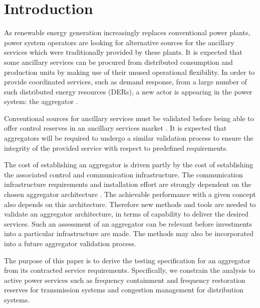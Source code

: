 \section{Introduction}
As renewable energy generation increasingly replaces conventional power plants, power system operators are looking for alternative sources for the ancillary services which were traditionally provided by these plants. It is expected that some ancillary services can be procured from distributed consumption and production units by making use of their unused operational flexibility. In order to provide coordinated services, such as demand response, from a large number of such distributed energy resources (DERs), a new actor is appearing in the power system: the aggregator .%

Conventional sources for ancillary services must be %
validated before being able to offer control reserves in an ancillary services market . It is expected that aggregators will be required to undergo a similar validation process to ensure the integrity of the provided service with respect to predefined requirements.

The cost of establishing an aggregator is driven partly by the cost of establishing the associated control and communication infrastructure. The communication infrastructure requirements and installation effort are strongly dependent on the chosen aggregator architecture . The achievable performance with a given concept also depends on this architecture. %
Therefore new methods and tools are needed to validate an aggregator architecture, in terms of capability to deliver the desired services. Such an assessment of an aggregator can be relevant before investments into a particular infrastructure are made. The methods may also be incorporated into a future aggregator validation process.

The purpose of this paper is to derive the testing specification for an aggregator from its contracted service requirements. Specifically, we constrain the analysis to active power services such as frequency containment and frequency restoration reserves  for transmission systems and congestion management for distribution systems. %
